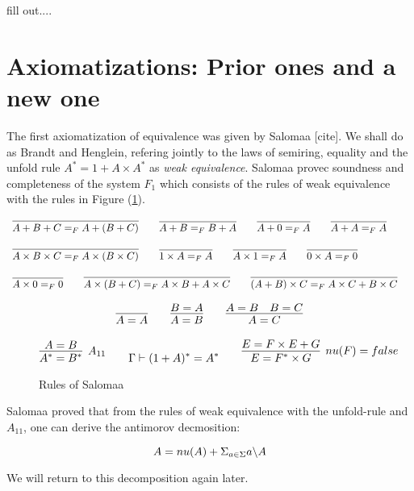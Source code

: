 \documentclass[a4paper,UKenglish,cleveref, autoref, thm-restate]{lipics-v2021}
\begin{document}
\begin{definition}
  fill out....
\end{definition}
\section{Axiomatizations:  Prior ones and a new one}
The first axiomatization of equivalence was given by Salomaa [cite]. We shall do as Brandt and Henglein, refering jointly to the laws of semiring, equality and the unfold rule $A^* = 1 + A \times A^*$ as \textit{weak equivalence}. Salomaa provec soundness and completeness of the system $F_1$ which consists of the rules of weak equivalence with the rules in Figure (\ref{fig:salomaa}).
\begin{definition}
\label{definition:ring}
\begin{displaymath}
\begin{array}{lll}
\myaxiom{A + B + C}{A + (B + C)} \qquad  
\myaxiom{A + B}{B + A} \qquad 
\myaxiom{A + 0}{A} \qquad
\myaxiom{A + A}{A} \qquad
\\\\
\myaxiom{A \times B \times C}{A \times (B \times C)} \qquad
\myaxiom{1 \times A}{A} \qquad
\myaxiom{A \times 1}{A} \qquad 
\myaxiom{0 \times A}{0} \qquad
\\\\
\myaxiom{A \times 0}{0} \qquad
\myaxiom{A \times (B + C)} {A \times B + A \times C} \qquad
\myaxiom{(A + B)\times C}{A \times C + B \times C}
\end{array}
\end{displaymath}
\end{definition}

\begin{definition}
\label{definition:equality}
\begin{displaymath}
\begin{array}{lll}
\infer{A = A}{}\qquad
\infer{A = B}{B = A}\qquad
\infer{A = C}{A = B & B = C}
\end{array}
\end{displaymath}
\end{definition}
\begin{figure}
\caption{Rules of Salomaa}
\label{fig:salomaa}
\begin{displaymath}
\infer[A_{11}]{\eqBodyE{A^*}{B^*}}
  {\eqBodyE{A}{B}} \qquad
\myaxiomN{(1 + A)^*}{A^*} \qquad \infer[\mynu{F}=\false]{\eqBodyE{E}{F^* \times G}}{\eqBodyE{E}{F \times E + G}}
\end{displaymath}
\end{figure}
Salomaa proved that from the rules of weak equivalence with the unfold-rule and $A_{11}$, one can derive the antimorov decmosition:
\begin{lemma}
\[A = \mynu{A} + \Sigma_{a \in \Sigma} \derive{a}{A}\]
\end{lemma}
We will return to this decomposition again later.
\end{document}
